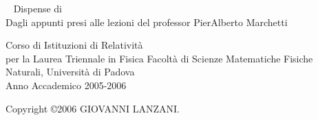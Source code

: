 \begin{titlepage}
\begin{center}
\mbox{} \vskip 2cm
\ \Huge \hskip 0.5cm Dispense di \\
\vskip 2cm
\normalsize Dagli appunti presi alle lezioni del professor PierAlberto Marchetti\\
\vskip 3cm

 Corso di Istituzioni di Relativit\`a \\
\hskip 1.78cm per la Laurea Triennale in Fisica \newline
Facolt\`a di Scienze Matematiche Fisiche Naturali, Universit\`a di Padova \\
Anno Accademico 2005-2006\\
\vspace{1cm}


\end{center}
\end{titlepage}


Copyright \copyright  2006 GIOVANNI LANZANI.
